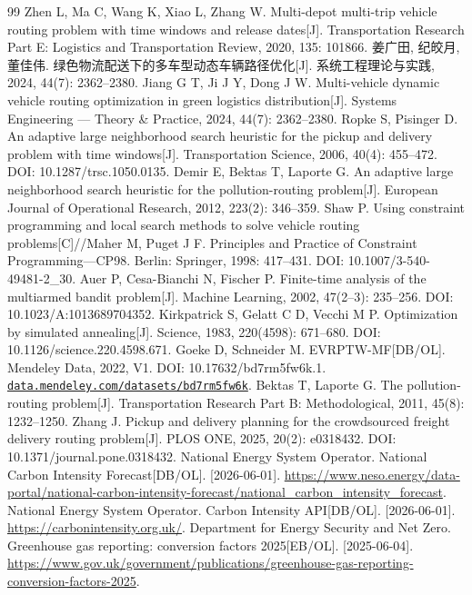 \documentclass{setp-new}
\begin{document}
\begin{thebibliography}{99}
 Zhen L, Ma C, Wang K, Xiao L, Zhang W. Multi-depot multi-trip vehicle routing problem with time windows and release dates[J]. Transportation Research Part E: Logistics and Transportation Review, 2020, 135: 101866.
 姜广田, 纪皎月, 董佳伟. 绿色物流配送下的多车型动态车辆路径优化[J]. 系统工程理论与实践, 2024, 44(7): 2362--2380. Jiang G T, Ji J Y, Dong J W. Multi-vehicle dynamic vehicle routing optimization in green logistics distribution[J]. Systems Engineering --- Theory \& Practice, 2024, 44(7): 2362--2380.
 Ropke S, Pisinger D. An adaptive large neighborhood search heuristic for the pickup and delivery problem with time windows[J]. Transportation Science, 2006, 40(4): 455--472. DOI: 10.1287/trsc.1050.0135.
 Demir E, Bektas T, Laporte G. An adaptive large neighborhood search heuristic for the pollution-routing problem[J]. European Journal of Operational Research, 2012, 223(2): 346--359.
 Shaw P. Using constraint programming and local search methods to solve vehicle routing problems[C]//Maher M, Puget J F. Principles and Practice of Constraint Programming---CP98. Berlin: Springer, 1998: 417--431. DOI: 10.1007/3-540-49481-2\_30.
 Auer P, Cesa-Bianchi N, Fischer P. Finite-time analysis of the multiarmed bandit problem[J]. Machine Learning, 2002, 47(2--3): 235--256. DOI: 10.1023/A:1013689704352.
 Kirkpatrick S, Gelatt C D, Vecchi M P. Optimization by simulated annealing[J]. Science, 1983, 220(4598): 671--680. DOI: 10.1126/science.220.4598.671.
 Goeke D, Schneider M. EVRPTW-MF[DB/OL]. Mendeley Data, 2022, V1. DOI: 10.17632/bd7rm5fw6k.1. \href{https://data.mendeley.com/datasets/bd7rm5fw6k}{\nolinkurl{data.mendeley.com/datasets/bd7rm5fw6k}}.
 Bektas T, Laporte G. The pollution-routing problem[J]. Transportation Research Part B: Methodological, 2011, 45(8): 1232--1250.
 Zhang J. Pickup and delivery planning for the crowdsourced freight delivery routing problem[J]. PLOS ONE, 2025, 20(2): e0318432. DOI: 10.1371/journal.pone.0318432.
 National Energy System Operator. National Carbon Intensity Forecast[DB/OL]. [2026-06-01]. \url{https://www.neso.energy/data-portal/national-carbon-intensity-forecast/national_carbon_intensity_forecast}.
 National Energy System Operator. Carbon Intensity API[DB/OL]. [2026-06-01]. \url{https://carbonintensity.org.uk/}.
 Department for Energy Security and Net Zero. Greenhouse gas reporting: conversion factors 2025[EB/OL]. [2025-06-04]. \url{https://www.gov.uk/government/publications/greenhouse-gas-reporting-conversion-factors-2025}.

\end{thebibliography}
\end{document}
